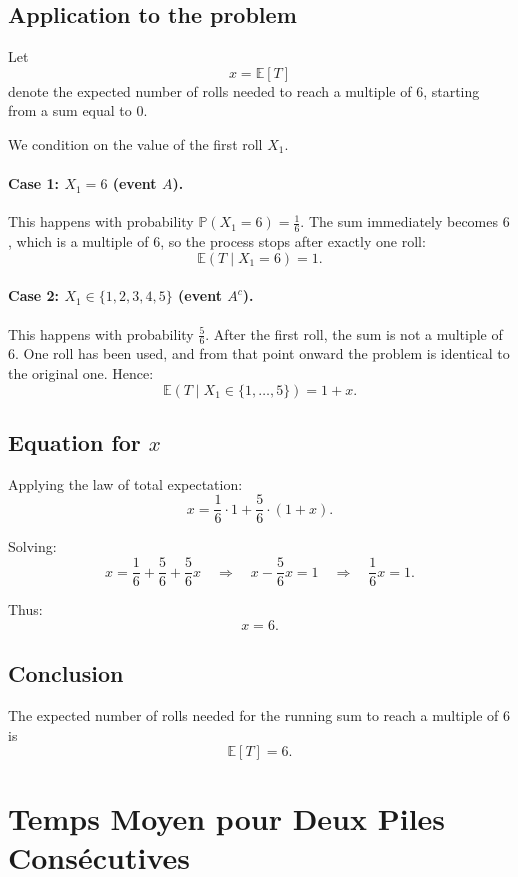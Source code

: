 \subsection*{Application to the problem}

Let
\[
x = \mathbb{E}[T]
\]
denote the expected number of rolls needed to reach a multiple of $6$, starting from a sum equal to $0$.

We condition on the value of the first roll $X_1$.

\paragraph{Case 1: $X_1 = 6$ (event $A$).}
This happens with probability $\mathbb{P}(X_1=6)=\frac{1}{6}$.  
The sum immediately becomes $6$, which is a multiple of $6$, so the process stops after exactly one roll:
\[
\mathbb{E}(T \mid X_1=6)=1.
\]

\paragraph{Case 2: $X_1 \in \{1,2,3,4,5\}$ (event $A^c$).}
This happens with probability $\frac{5}{6}$.  
After the first roll, the sum is not a multiple of $6$. One roll has been used, and from that point onward the problem is identical to the original one.
Hence:
\[
\mathbb{E}(T \mid X_1 \in \{1,\dots,5\}) = 1 + x.
\]

\subsection*{Equation for $x$}

Applying the law of total expectation:
\[
x
=
\frac{1}{6}\cdot 1
+
\frac{5}{6}\cdot (1+x).
\]

Solving:
\[
x = \frac{1}{6} + \frac{5}{6} + \frac{5}{6}x
\quad\Longrightarrow\quad
x - \frac{5}{6}x = 1
\quad\Longrightarrow\quad
\frac{1}{6}x = 1.
\]

Thus:
\[
\boxed{x = 6}.
\]

\subsection*{Conclusion}

The expected number of rolls needed for the running sum to reach a multiple of $6$ is
\[
\boxed{\mathbb{E}[T]=6}.
\]


\section{Temps Moyen pour Deux Piles Consécutives}

